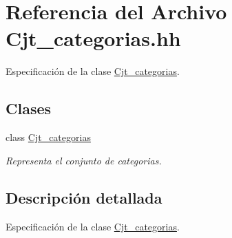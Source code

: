 \hypertarget{_cjt__categorias_8hh}{}\section{Referencia del Archivo Cjt\+\_\+categorias.\+hh}
\label{_cjt__categorias_8hh}


Especificación de la clase \hyperlink{class_cjt__categorias}{Cjt\+\_\+categorias}.  


\subsection*{Clases}
\begin{DoxyCompactItemize}
\item 
class \hyperlink{class_cjt__categorias}{Cjt\+\_\+categorias}
\begin{DoxyCompactList}\small\item\em Representa el conjunto de categorias. \end{DoxyCompactList}\end{DoxyCompactItemize}


\subsection{Descripción detallada}
Especificación de la clase \hyperlink{class_cjt__categorias}{Cjt\+\_\+categorias}. 

